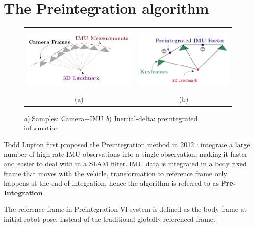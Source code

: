 \documentclass[12pt]{article}   %
\begin{document}
\section{The Preintegration algorithm}

\begin{figure}[!h]
	\begin{center}\begin{tabular}{cc}
			\includegraphics[height=3.3cm]{figures/IMU-sample_Image-frames_3D_illustration.png}&
			\includegraphics[height=3.3cm]{figures/Preintegrated-IMU_image_3D_illustration.png}\\
			(a) & (b) \\
		\end{tabular}\end{center}
		\caption{\emph{a}) Samples: Camera+IMU \emph{b}) Inertial-delta: preintegrated information \cite{Manifold2015}} 
		\label{fig:VIN sensor information}
	\end{figure} 
Todd Lupton first proposed the Preintegration method in 2012 \cite{Lupton2012}: integrate a large number of high rate IMU observations into a single observation, making it faster and easier to deal with in a SLAM filter. IMU data is integrated in a body fixed frame that moves with the vehicle, transformation to reference frame only happens at the end of integration, hence the algorithm is referred to as \textbf{Pre-Integration}.

The reference frame in Preintegration VI system is defined as the body frame at initial robot pose, instead of the traditional globally referenced frame.

\end{document}
